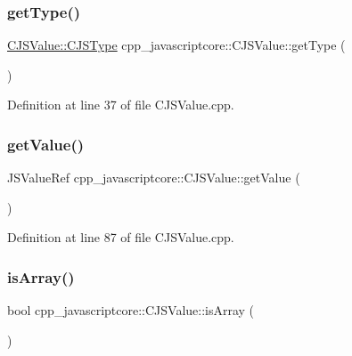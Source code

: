 \subsubsection{\texorpdfstring{get\+Type()}{getType()}}
{\footnotesize\ttfamily \mbox{\hyperlink{classcpp__javascriptcore_1_1_c_j_s_value_a72505affa6537ee81f1d447fab22a890}{C\+J\+S\+Value\+::\+C\+J\+S\+Type}} cpp\+\_\+javascriptcore\+::\+C\+J\+S\+Value\+::get\+Type (\begin{DoxyParamCaption}{ }\end{DoxyParamCaption})}



Definition at line 37 of file C\+J\+S\+Value.\+cpp.

\mbox{\label{classcpp__javascriptcore_1_1_c_j_s_value_a63adc9941be4f4feca788f4991f4de5f}} 
\subsubsection{\texorpdfstring{get\+Value()}{getValue()}}
{\footnotesize\ttfamily J\+S\+Value\+Ref cpp\+\_\+javascriptcore\+::\+C\+J\+S\+Value\+::get\+Value (\begin{DoxyParamCaption}{ }\end{DoxyParamCaption})}



Definition at line 87 of file C\+J\+S\+Value.\+cpp.

\mbox{\label{classcpp__javascriptcore_1_1_c_j_s_value_ae8bf26df8482440d666c34eec43bb906}} 
\subsubsection{\texorpdfstring{is\+Array()}{isArray()}}
{\footnotesize\ttfamily bool cpp\+\_\+javascriptcore\+::\+C\+J\+S\+Value\+::is\+Array (\begin{DoxyParamCaption}{ }\end{DoxyParamCaption})}



